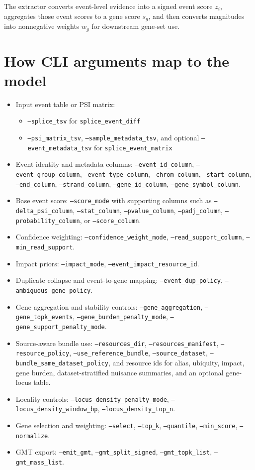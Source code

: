 \documentclass[11pt]{article}
\begin{document}
The extractor converts event-level evidence into a signed event score $z_i$, aggregates those event scores to a gene score $s_g$, and then converts magnitudes into nonnegative weights $w_g$ for downstream gene-set use.

\section{How CLI arguments map to the model}
\begin{itemize}[leftmargin=2em]
\item Input event table or PSI matrix:
  \begin{itemize}
  \item \texttt{--splice\_tsv} for \texttt{splice\_event\_diff}
  \item \texttt{--psi\_matrix\_tsv}, \texttt{--sample\_metadata\_tsv}, and optional \texttt{--event\_metadata\_tsv} for \texttt{splice\_event\_matrix}
  \end{itemize}
\item Event identity and metadata columns:
  \texttt{--event\_id\_column}, \texttt{--event\_group\_column}, \texttt{--event\_type\_column},
  \texttt{--chrom\_column}, \texttt{--start\_column}, \texttt{--end\_column}, \texttt{--strand\_column},
  \texttt{--gene\_id\_column}, \texttt{--gene\_symbol\_column}.
\item Base event score:
  \texttt{--score\_mode} with supporting columns such as \texttt{--delta\_psi\_column}, \texttt{--stat\_column}, \texttt{--pvalue\_column}, \texttt{--padj\_column}, \texttt{--probability\_column}, or \texttt{--score\_column}.
\item Confidence weighting:
  \texttt{--confidence\_weight\_mode}, \texttt{--read\_support\_column}, \texttt{--min\_read\_support}.
\item Impact priors:
  \texttt{--impact\_mode}, \texttt{--event\_impact\_resource\_id}.
\item Duplicate collapse and event-to-gene mapping:
  \texttt{--event\_dup\_policy}, \texttt{--ambiguous\_gene\_policy}.
\item Gene aggregation and stability controls:
  \texttt{--gene\_aggregation}, \texttt{--gene\_topk\_events},
  \texttt{--gene\_burden\_penalty\_mode}, \texttt{--gene\_support\_penalty\_mode}.
\item Source-aware bundle use:
  \texttt{--resources\_dir}, \texttt{--resources\_manifest}, \texttt{--resource\_policy}, \texttt{--use\_reference\_bundle},
  \texttt{--source\_dataset}, \texttt{--bundle\_same\_dataset\_policy},
  and resource ids for alias, ubiquity, impact, gene burden, dataset-stratified nuisance summaries, and an optional gene-locus table.
\item Locality controls:
  \texttt{--locus\_density\_penalty\_mode}, \texttt{--locus\_density\_window\_bp}, \texttt{--locus\_density\_top\_n}.
\item Gene selection and weighting:
  \texttt{--select}, \texttt{--top\_k}, \texttt{--quantile}, \texttt{--min\_score}, \texttt{--normalize}.
\item GMT export:
  \texttt{--emit\_gmt}, \texttt{--gmt\_split\_signed}, \texttt{--gmt\_topk\_list}, \texttt{--gmt\_mass\_list}.
\end{itemize}
\end{document}
